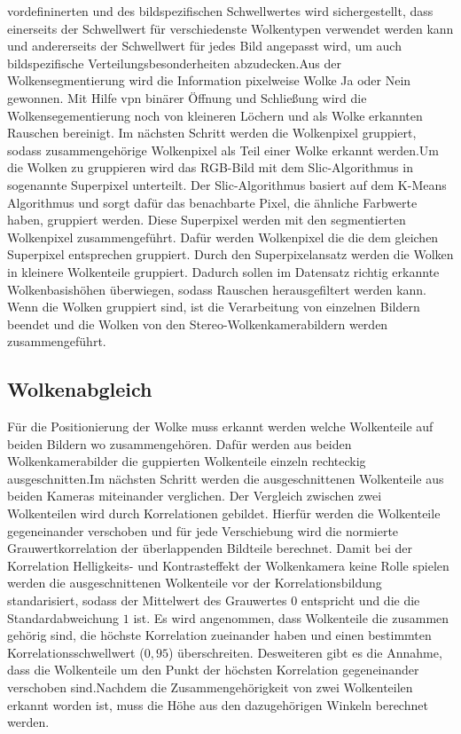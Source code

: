 \documentclass[a4paper,11pt,twoside,german]{article}
\newcommand{\absatz}{\smallbreak}
\begin{document}
vordefininerten und des bildspezifischen Schwellwertes wird sichergestellt, dass
einerseits der Schwellwert für verschiedenste Wolkentypen verwendet werden kann
und andererseits der Schwellwert für jedes Bild angepasst wird, um auch
bildspezifische Verteilungsbesonderheiten abzudecken.\absatz Aus der
Wolkensegmentierung wird die Information pixelweise Wolke Ja oder Nein gewonnen.
Mit Hilfe vpn binärer Öffnung und Schließung wird die Wolkensegementierung noch
von kleineren Löchern und als Wolke erkannten Rauschen bereinigt. Im nächsten
Schritt werden die Wolkenpixel gruppiert, sodass zusammengehörige Wolkenpixel
als Teil einer Wolke erkannt werden.\absatz Um die Wolken zu gruppieren wird das
RGB-Bild mit dem Slic-Algorithmus in sogenannte Superpixel unterteilt. Der
Slic-Algorithmus basiert auf dem K-Means Algorithmus und sorgt dafür das
benachbarte Pixel, die ähnliche Farbwerte haben, gruppiert werden. Diese
Superpixel werden mit den segmentierten Wolkenpixel zusammengeführt. Dafür
werden Wolkenpixel die die dem gleichen Superpixel entsprechen gruppiert. Durch
den Superpixelansatz werden die Wolken in kleinere Wolkenteile gruppiert.
Dadurch sollen im Datensatz richtig erkannte Wolkenbasishöhen überwiegen, sodass
Rauschen herausgefiltert werden kann.  \absatz Wenn die Wolken gruppiert sind,
ist die Verarbeitung von einzelnen Bildern beendet und die Wolken von den
Stereo-Wolkenkamerabildern werden zusammengeführt.

\subsection{Wolkenabgleich}
Für die Positionierung der Wolke muss erkannt werden
welche Wolkenteile auf beiden Bildern wo zusammengehören. Dafür werden aus
beiden Wolkenkamerabilder die guppierten Wolkenteile einzeln rechteckig
ausgeschnitten.\absatz Im nächsten Schritt werden die ausgeschnittenen Wolkenteile
aus beiden Kameras miteinander verglichen. Der Vergleich zwischen zwei
Wolkenteilen wird durch Korrelationen gebildet. Hierfür werden die Wolkenteile
gegeneinander verschoben und für jede Verschiebung wird die normierte
Grauwertkorrelation der überlappenden Bildteile berechnet. Damit bei der
Korrelation Helligkeits- und Kontrasteffekt der Wolkenkamera keine Rolle spielen
werden die ausgeschnittenen Wolkenteile vor der Korrelationsbildung
standarisiert, sodass der Mittelwert des Grauwertes $0$ entspricht und die die
Standardabweichung $1$ ist. Es wird angenommen, dass Wolkenteile die zusammen
gehörig sind, die höchste Korrelation zueinander haben und einen bestimmten
Korrelationsschwellwert ($0,95$) überschreiten. Desweiteren gibt es die Annahme,
dass die Wolkenteile um den Punkt der höchsten Korrelation gegeneinander
verschoben sind.\absatz Nachdem die Zusammengehörigkeit von zwei Wolkenteilen erkannt
worden ist, muss die Höhe aus den dazugehörigen Winkeln berechnet werden.
\end{document}
